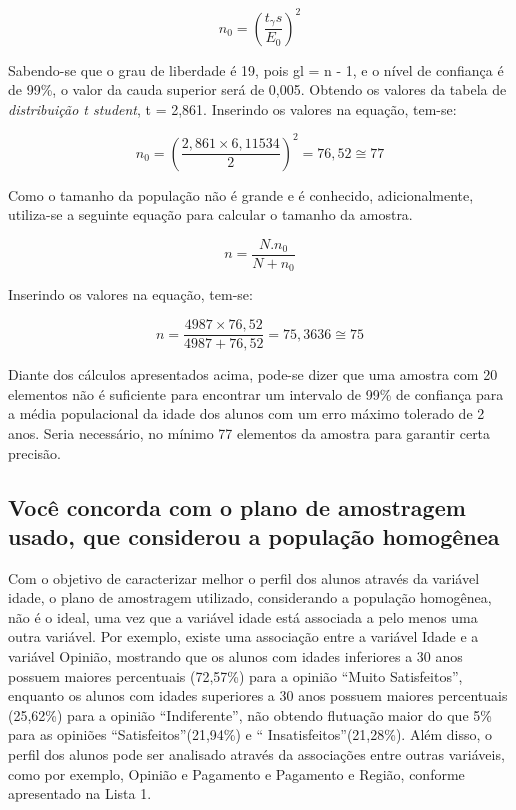 \begin{equation*}
  n_0 = \left (\frac{t_\gamma s}{E_0} \right)^2
\end{equation*}

Sabendo-se que o grau de liberdade é 19, pois gl = n - 1, e o nível de confiança é de 99\%, o valor da cauda superior será de 0,005. Obtendo os valores da tabela de \textit{distribuição t student}, t 
= 2,861. Inserindo os valores na equação, tem-se:

\begin{equation*}
 n_0 = \left (\frac{2,861 \times 6,11534}{2} \right)^2 = 76,52 \cong 77
\end{equation*}

Como o tamanho da população não é grande e é conhecido, adicionalmente, utiliza-se a seguinte equação para calcular o tamanho da amostra.

\begin{equation*}
 n = \frac{N . n_0}{N + n_0}
\end{equation*}

Inserindo os valores na equação, tem-se:

\begin{equation*}
 n = \frac{4987 \times 76,52}{4987 + 76,52} = 75,3636 \cong 75
\end{equation*}

Diante dos cálculos apresentados acima, pode-se dizer que uma amostra com 20 elementos não é suficiente para encontrar um intervalo de 99\% de confiança para a média populacional da idade dos alunos 
com um erro máximo tolerado de 2 anos. Seria necessário, no mínimo 77 elementos da amostra para garantir certa precisão. 

\subsection{Você concorda com o plano de amostragem usado, que considerou a população homogênea}
Com o objetivo de caracterizar melhor o perfil dos alunos através da variável idade, o plano de amostragem utilizado, considerando a população homogênea, não é o ideal, uma vez que a variável idade 
está associada a pelo menos uma outra variável. Por exemplo, existe uma associação entre a variável Idade e a variável Opinião, mostrando que os alunos com idades inferiores a 30 anos possuem maiores 
percentuais (72,57\%) para a opinião \textquotedblleft Muito Satisfeitos\textquotedblright, enquanto os alunos com idades superiores a 30 anos possuem maiores percentuais (25,62\%) para a opinião 
\textquotedblleft Indiferente\textquotedblright, não obtendo flutuação maior do que 5\% para as opiniões \textquotedblleft Satisfeitos\textquotedblright (21,94\%) e \textquotedblleft 
Insatisfeitos\textquotedblright (21,28\%). Além disso, o perfil dos alunos pode ser analisado através da associações entre outras variáveis, como por exemplo, Opinião e Pagamento e Pagamento e 
Região, conforme apresentado na Lista 1. 


